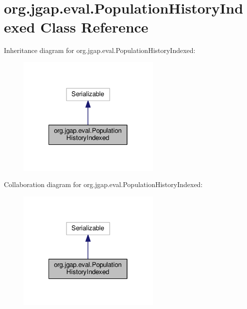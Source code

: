 \hypertarget{classorg_1_1jgap_1_1eval_1_1_population_history_indexed}{\section{org.\-jgap.\-eval.\-Population\-History\-Indexed Class Reference}
\label{classorg_1_1jgap_1_1eval_1_1_population_history_indexed}
}


Inheritance diagram for org.\-jgap.\-eval.\-Population\-History\-Indexed\-:
\nopagebreak
\begin{figure}[H]
\begin{center}
\leavevmode
\includegraphics[width=200pt]{classorg_1_1jgap_1_1eval_1_1_population_history_indexed__inherit__graph}
\end{center}
\end{figure}


Collaboration diagram for org.\-jgap.\-eval.\-Population\-History\-Indexed\-:
\nopagebreak
\begin{figure}[H]
\begin{center}
\leavevmode
\includegraphics[width=200pt]{classorg_1_1jgap_1_1eval_1_1_population_history_indexed__coll__graph}
\end{center}
\end{figure}
